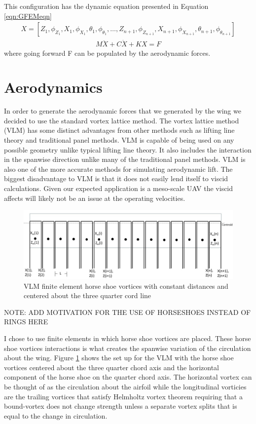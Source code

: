 \documentclass[11pt]{ucthesis}
\begin{document}
This configuration has the dynamic equation presented in Equation \ref{eqn:GFEMeqn}
\begin{eqnarray}
X = [Z_1,\phi_{Z_1}, X_1,\phi_{X_1},\theta_1,\phi_{\theta_1}, \ldots,Z_{n+1},\phi_{Z_{n+1}}, X_{n+1},\phi_{X_{n+1}},\theta_{n+1},\phi_{\theta_{n+1}}]
\end{eqnarray}
\begin{eqnarray}
M\ddot{X}+C\dot{X}+KX = F
\label{eqn:GFEMeqn}
\end{eqnarray}
where going forward F can be populated by the aerodynamic forces.

\section{Aerodynamics}
\label{sec:aeroModel}
In order to generate the aerodynamic forces that we generated by the wing we decided to use the standard vortex lattice method. The vortex lattice method (VLM) has some distinct advantages from other methods such as lifting line theory and traditional panel methods. VLM is capable of being used on any possible geometry unlike typical lifting line theory. It also includes the interaction in the spanwise direction unlike many of the traditional panel methods. VLM is also one of the more accurate methods for simulating aerodynamic lift. \cite{bertin1998aerodynamics} The biggest disadvantage to VLM is that it does not easily lend itself to viscid calculations. Given our expected application is a meso-scale UAV the viscid affects will likely not be an issue at the operating velocities.
\begin{figure}[h]
\centering
\includegraphics[width=1\linewidth]{Figures/VortexLaticeMethod.jpg}
\caption{VLM finite element horse shoe vortices with constant distances and centered about the three quarter cord line}
\label{fig:VLM}
\end{figure}

{\color{red}NOTE: ADD MOTIVATION FOR THE USE OF HORSESHOES INSTEAD OF RINGS HERE}

I chose to use finite elements in which horse shoe vortices are placed. These horse shoe vortices interactions is what creates the spanwise variation of the circulation about the wing. Figure \ref{fig:VLM} shows the set up for the VLM with the horse shoe vortices centered about the three quarter chord axis and the horizontal component of the horse shoe on the quarter chord axis. The horizontal vortex can be thought of as the circulation about the airfoil while the longitudinal vorticies are the trailing vortices that satisfy Helmholtz vortex theorem requiring that a bound-vortex does not change strength unless a separate vortex splits that is equal to the change in circulation. 
\end{document}
